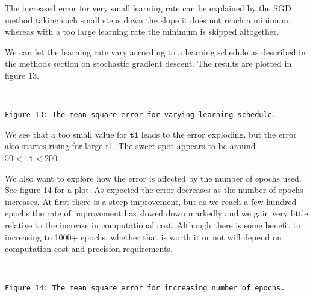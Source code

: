 \documentclass[11pt]{article}
\begin{document}
    The increased error for very small learning rate can be explained by the
SGD method taking such small steps down the slope it does not reach a
minimum, whereas with a too large learning rate the minimum is skipped
altogether.

We can let the learning rate vary according to a learning schedule as
described in the methods section on stochastic gradient descent. The
results are plotted in figure 13.

    \begin{center}
    \end{center}
    { \hspace*{\fill} \\}
    
    \begin{Verbatim}[commandchars=\\\{\}]
Figure 13: The mean square error for varying learning schedule.
    \end{Verbatim}

    We see that a too small value for \(\texttt{t1}\) leads to the error
exploding, but the error also startes rising for large t1. The sweet
spot appears to be around \(50<\texttt{t1}<200\).

We also want to explore how the error is affected by the number of
epochs used. See figure 14 for a plot. As expected the error decreases
as the number of epochs increases. At first there is a steep
improvement, but as we reach a few hundred epochs the rate of
improvement has slowed down markedly and we gain very little relative to
the increase in computational cost. Although there is some benefit to
increasing to 1000+ epochs, whether that is worth it or not will depend
on computation cost and precision requirements.

    \begin{center}
    \end{center}
    { \hspace*{\fill} \\}
    
    \begin{Verbatim}[commandchars=\\\{\}]
Figure 14: The mean square error for increasing number of epochs.
    \end{Verbatim}

    \begin{center}
    \end{center}
    { \hspace*{\fill} \\}
    
\end{document}
